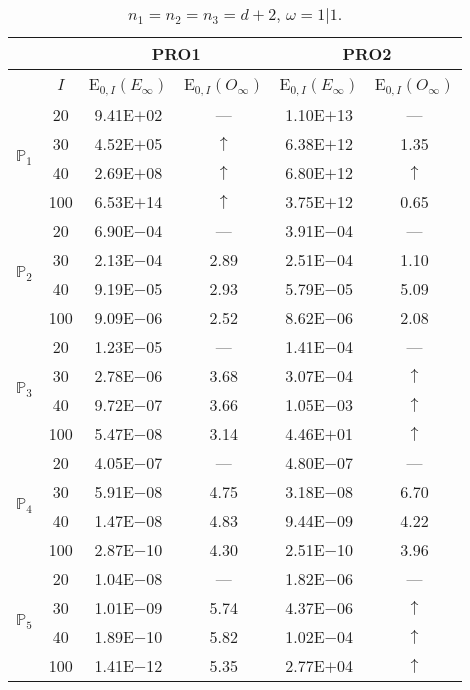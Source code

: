 \begin{table}[H]
\caption{$n_1=n_2=n_3=d+2$, $\omega=1|1$.}
\setlength{\tabcolsep}{5pt}
\centering
\begin{tabular}{@{}l c c c c c@{}}
\toprule
 &  & \multicolumn{2}{c}{PRO1} & \multicolumn{2}{c}{PRO2}\\
\midrule
 & $I$ & E$_{0,I}(E_{\infty})$ & E$_{0,I}(O_{\infty})$ & E$_{0,I}(E_{\infty})$ & E$_{0,I}(O_{\infty})$\\
\midrule
\multirow{4}{*}{$\mathbb{P}_{1}$}
 & 20 & 9.41E$+$02 & --- & 1.10E$+$13 & ---\\
 & 30 & 4.52E$+$05 & $\uparrow$ & 6.38E$+$12 & 1.35 \\
 & 40 & 2.69E$+$08 & $\uparrow$ & 6.80E$+$12 & $\uparrow$ \\
 & 100 & 6.53E$+$14 & $\uparrow$ & 3.75E$+$12 & 0.65 \\
\midrule
\multirow{4}{*}{$\mathbb{P}_{2}$}
 & 20 & 6.90E$-$04 & --- & 3.91E$-$04 & ---\\
 & 30 & 2.13E$-$04 & 2.89 & 2.51E$-$04 & 1.10 \\
 & 40 & 9.19E$-$05 & 2.93 & 5.79E$-$05 & 5.09 \\
 & 100 & 9.09E$-$06 & 2.52 & 8.62E$-$06 & 2.08 \\
\midrule
\multirow{4}{*}{$\mathbb{P}_{3}$}
 & 20 & 1.23E$-$05 & --- & 1.41E$-$04 & ---\\
 & 30 & 2.78E$-$06 & 3.68 & 3.07E$-$04 & $\uparrow$ \\
 & 40 & 9.72E$-$07 & 3.66 & 1.05E$-$03 & $\uparrow$ \\
 & 100 & 5.47E$-$08 & 3.14 & 4.46E$+$01 & $\uparrow$ \\
\midrule
\multirow{4}{*}{$\mathbb{P}_{4}$}
 & 20 & 4.05E$-$07 & --- & 4.80E$-$07 & ---\\
 & 30 & 5.91E$-$08 & 4.75 & 3.18E$-$08 & 6.70 \\
 & 40 & 1.47E$-$08 & 4.83 & 9.44E$-$09 & 4.22 \\
 & 100 & 2.87E$-$10 & 4.30 & 2.51E$-$10 & 3.96 \\
\midrule
\multirow{4}{*}{$\mathbb{P}_{5}$}
 & 20 & 1.04E$-$08 & --- & 1.82E$-$06 & ---\\
 & 30 & 1.01E$-$09 & 5.74 & 4.37E$-$06 & $\uparrow$ \\
 & 40 & 1.89E$-$10 & 5.82 & 1.02E$-$04 & $\uparrow$ \\
 & 100 & 1.41E$-$12 & 5.35 & 2.77E$+$04 & $\uparrow$ \\
\bottomrule
\end{tabular}
\label{Table:PRO:Rodrigo:Test9}
\end{table}
